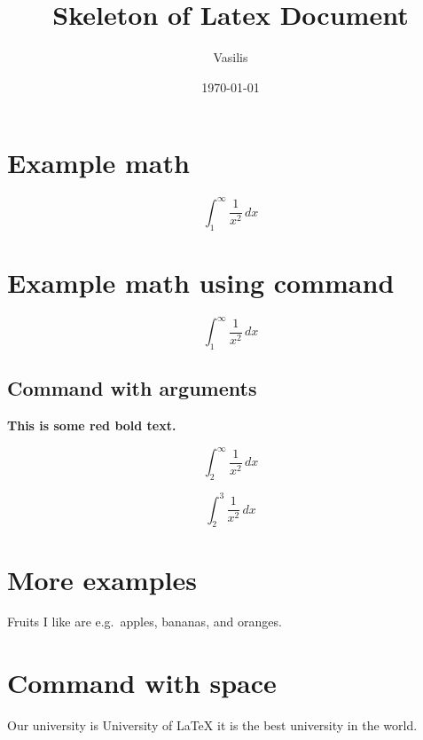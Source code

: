 \documentclass{article}
\title{Skeleton of Latex Document}
\author{Vasilis}
\date{\today}
\newcommand{\universityname}{University of LaTeX\xspace}
\newcommand{\intinf}{\int_{1}^{\infty}}
\newcommand{\bfred}[1]{\textbf{\color{red} #1}}
\newcommand{\intinfarg}[2]{\int_{#1}^{#2}}
\newcommand{\eg}{e.g.\ }
\begin{document}
\maketitle

\section{Example math}
\[\int_{1}^{\infty} \frac{1}{x^2} \, dx\]

\section{Example math using command}
\[\intinf \frac{1}{x^2} \, dx\]

\subsection{Command with arguments}

\bfred{This is some red bold text.}

\[\intinfarg{2}{\infty} \frac{1}{x^2} \, dx\]

\[\intinfarg{2}{3} \frac{1}{x^2} \, dx\]

\section{More examples}
Fruits I like are \eg apples, bananas, and oranges.

\section{Command with space}
Our university is \universityname it is the best university in the world.
\end{document}
